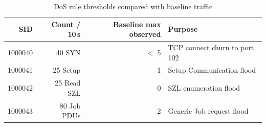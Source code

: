 \begin{table}[H]
    \centering
    \footnotesize
    \begin{tabular}{|r|r|r|l|}
        \hline
        \textbf{SID} & \textbf{Count / 10\,s} & \textbf{Baseline max observed} & \textbf{Purpose} \\
        \hline
        1000040 & 40 SYN & $<$ 5 & TCP connect churn to port 102 \\
        \hline
        1000041 & 25 Setup & 1 & Setup Communication flood \\
        \hline
        1000042 & 25 Read SZL & 0 & SZL enumeration flood \\
        \hline
        1000043 & 80 Job PDUs & 2 & Generic Job request flood \\
        \hline
    \end{tabular}
    \caption{DoS rule thresholds compared with baseline traffic}
    \label{tab:eval-dos-thresholds}
\end{table}
